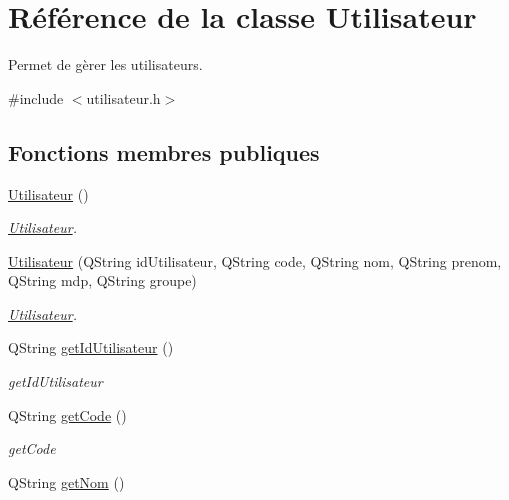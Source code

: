 \hypertarget{class_utilisateur}{}\section{Référence de la classe Utilisateur}
\label{class_utilisateur}


Permet de gèrer les utilisateurs.  




{\ttfamily \#include $<$utilisateur.\+h$>$}

\subsection*{Fonctions membres publiques}
\begin{DoxyCompactItemize}
\item 
\mbox{\label{class_utilisateur_ae76433a6d353c5f5ad0c6a6af64022ad}} 
\mbox{\hyperlink{class_utilisateur_ae76433a6d353c5f5ad0c6a6af64022ad}{Utilisateur}} ()
\begin{DoxyCompactList}\small\item\em \mbox{\hyperlink{class_utilisateur}{Utilisateur}}. \end{DoxyCompactList}\item 
\mbox{\hyperlink{class_utilisateur_aab43c0ee89962ff55479cb8f1fd19fa8}{Utilisateur}} (Q\+String id\+Utilisateur, Q\+String code, Q\+String nom, Q\+String prenom, Q\+String mdp, Q\+String groupe)
\begin{DoxyCompactList}\small\item\em \mbox{\hyperlink{class_utilisateur}{Utilisateur}}. \end{DoxyCompactList}\item 
Q\+String \mbox{\hyperlink{class_utilisateur_ac86c327563c837920f2b12c482adffd9}{get\+Id\+Utilisateur}} ()
\begin{DoxyCompactList}\small\item\em get\+Id\+Utilisateur \end{DoxyCompactList}\item 
Q\+String \mbox{\hyperlink{class_utilisateur_a4b145e96bc7cec4779d4dfefe9b40c35}{get\+Code}} ()
\begin{DoxyCompactList}\small\item\em get\+Code \end{DoxyCompactList}\item 
Q\+String \mbox{\hyperlink{class_utilisateur_a84a4aa7b7f2fde194e9c706a8eb711e5}{get\+Nom}} ()

\end{DoxyCompactItemize}
